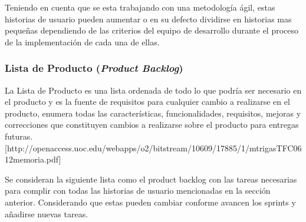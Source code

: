 Teniendo en cuenta que se esta trabajando con una metodología ágil, estas historias de usuario pueden aumentar o en su defecto dividirse en historias mas pequeñas dependiendo de las criterios del equipo de desarrollo durante el proceso de la implementación de cada una de ellas.




\subsubsection{Lista de Producto (\textit{Product Backlog})}
La Lista de Producto es una lista ordenada de todo lo que podría ser necesario en el producto y es la fuente de requisitos para cualquier cambio a realizarse en el producto, enumera todas las características, funcionalidades, requisitos, mejoras y correcciones que constituyen cambios a realizarse sobre el producto para entregas futuras.[http://openaccess.uoc.edu/webapps/o2/bitstream/10609/17885/1/mtrigasTFC0612memoria.pdf]

Se consideran la siguiente lista como el product backlog con las tareas necesarias para complir con todas las historias de usuario mencionadas en la sección anterior.
Considerando que estas pueden cambiar conforme avancen los sprints y añadirse nuevas tareas.


